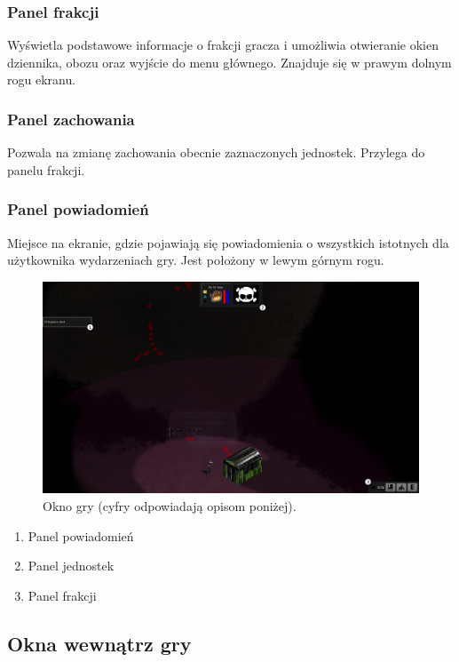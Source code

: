 \documentclass[licencjacka]{pracamgr}
\begin{document}
      \subsubsection{Panel frakcji}
	Wyświetla podstawowe informacje o frakcji gracza i umożliwia otwieranie okien dziennika, obozu oraz wyjście do menu głównego.
	Znajduje się w prawym dolnym rogu ekranu.
      \subsubsection{Panel zachowania}
	Pozwala na zmianę zachowania obecnie zaznaczonych jednostek. Przylega do panelu frakcji.
      \subsubsection{Panel powiadomień}
	Miejsce na ekranie, gdzie pojawiają się powiadomienia o wszystkich istotnych dla użytkownika wydarzeniach gry. Jest położony w lewym górnym rogu.

      \begin{figure}[htbp]
	\centering
	\includegraphics[scale=0.22]{Game.png}
	\caption{Okno gry (cyfry odpowiadają opisom poniżej).}
      \end{figure}

      \begin{enumerate}
       \item Panel powiadomień
       \item Panel jednostek
       \item Panel frakcji
      \end{enumerate}

    \subsection{Okna wewnątrz gry}
\end{document}
